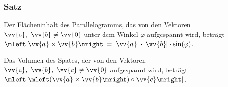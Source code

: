 \documentclass[a4paper,12pt]{article}
\begin{document}
\subsubsection{Satz}
Der Flächeninhalt des Parallelogramms, das von den Vektoren $\vv{a}, \ \vv{b} \neq \vv{0}$ unter dem Winkel $\varphi$ aufgespannt wird, beträgt $\mleft| \vv{a} \times \vv{b} \mright| = |\vv{a}| \cdot |\vv{b}| \cdot \sin(\varphi)$. \par
Das Volumen des Spates, der von den Vektoren $\vv{a}, \ \vv{b}, \ \vv{c} \neq \vv{0}$ aufgespannt wird, beträgt $\mleft| \mleft( \vv{a} \times \vv{b}\mright) \circ \vv{c} \mright|$.
\end{document}
